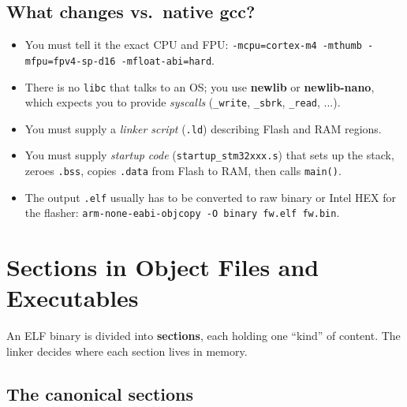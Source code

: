 \documentclass[11pt,a4paper]{article}
\begin{document}
\subsection{What changes vs.\ native gcc?}

\begin{itemize}[leftmargin=*]
    \item You must tell it the exact CPU and FPU:
    \texttt{-mcpu=cortex-m4 -mthumb -mfpu=fpv4-sp-d16 -mfloat-abi=hard}.
    \item There is no \texttt{libc} that talks to an OS; you use
    \textbf{newlib} or \textbf{newlib-nano}, which expects you to provide
    \emph{syscalls} (\texttt{\_write}, \texttt{\_sbrk}, \texttt{\_read}, ...).
    \item You must supply a \emph{linker script} (\texttt{.ld}) describing
    Flash and RAM regions.
    \item You must supply \emph{startup code} (\texttt{startup\_stm32xxx.s})
    that sets up the stack, zeroes \texttt{.bss}, copies \texttt{.data} from
    Flash to RAM, then calls \texttt{main()}.
    \item The output \texttt{.elf} usually has to be converted to raw binary
    or Intel HEX for the flasher:
    \texttt{arm-none-eabi-objcopy -O binary fw.elf fw.bin}.
\end{itemize}

\section{Sections in Object Files and Executables}

An ELF binary is divided into \textbf{sections}, each holding one ``kind'' of
content. The linker decides where each section lives in memory.

\subsection{The canonical sections}
\end{document}
